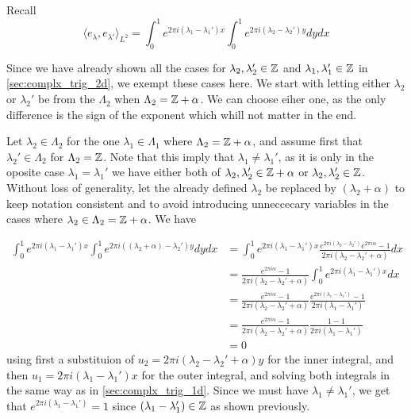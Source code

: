\documentclass[../thesis.tex]{subfiles}
\begin{document}
Recall 
\begin{equation*}
    \langle e_\lambda,e_{\lambda'} \rangle_{L^2} = \int_0^1e^{2\pi i  (\lambda_1- \lambda_1')x}\int_0^1  e^{2\pi i  (\lambda_2 - \lambda_2')y} dy dx
\end{equation*}

Since we have already shown all the cases for $\lambda_2,\lambda_2' \in \mathbb{Z}$ and $\lambda_1,\lambda_1' \in \mathbb{Z}$ in \cref{sec:complx_trig_2d}, we exempt these cases here. We start with letting either $\lambda_2$ or $\lambda_2'$ be from the $\Lambda_2$ when $\Lambda_2=\mathbb{Z}+\alpha$. We can choose eiher one, as the only difference is the sign of the exponent which whill not matter in the end.

Let $\lambda_2\in \Lambda_2$ for the one $\lambda_1\in\Lambda_1$ where $\Lambda_2=\mathbb{Z}+\alpha$, and assume first that $\lambda_2'\in \Lambda_2$ for $\Lambda_2 = \mathbb{Z}$. Note that this imply that $\lambda_1\neq\lambda_1'$, as it is only in the oposite case $\lambda_1 = \lambda_1'$ we have either both of $\lambda_2,\lambda_2' \in \mathbb{Z}+\alpha$ or $\lambda_2,\lambda_2' \in \mathbb{Z}$. Without loss of generality, let the already defined $\lambda_2$ be replaced by $(\lambda_2+\alpha)$ to keep notation consistent and to avoid introducing unneccecary variables in the cases where $\lambda_2 \in \Lambda_2 = \mathbb{Z}+\alpha$. We have

\begin{align*}
    \int_0^1e^{2\pi i  (\lambda_1- \lambda_1')x}\int_0^1  e^{2\pi i  ((\lambda_2+\alpha) - \lambda_2')y} dydx 
    &= \int_0^1e^{2\pi i  (\lambda_1- \lambda_1')x} \frac{e^{2\pi i (\lambda_2-\lambda_2')}e^{2\pi i \alpha}-1}{2\pi i (\lambda_2-\lambda_2'+\alpha)}dx\\ 
    &= \frac{e^{2\pi i \alpha}-1}{2\pi i (\lambda_2-\lambda_2'+\alpha)} \int_0^1e^{2\pi i  (\lambda_1- \lambda_1')x} dx\\ 
    &= \frac{e^{2\pi i \alpha}-1}{2\pi i (\lambda_2-\lambda_2'+\alpha)} \frac{e^{2\pi i (\lambda_1- \lambda_1')}-1}{2\pi i (\lambda_1- \lambda_1')}\\
    &= \frac{e^{2\pi i \alpha}-1}{2\pi i (\lambda_2-\lambda_2'+\alpha)} \frac{1-1}{2\pi i (\lambda_1- \lambda_1')}\\
    &= 0 
\end{align*}
using first a substituion of $u_2=2 \pi i (\lambda_2-\lambda_2'+\alpha)y$ for the inner integral, and then $u_1=2 \pi i (\lambda_1-\lambda_1')x$ for the outer integral, and solving both integrals in the same way as in \cref{sec:complx_trig_1d}. Since we must have $\lambda_1 \neq \lambda_1'$, we get that $e^{2\pi i (\lambda_1-\lambda_1')} = 1$ since $(\lambda_1-\lambda_1')\in \mathbb{Z}$ as shown previously. 
\end{document}
